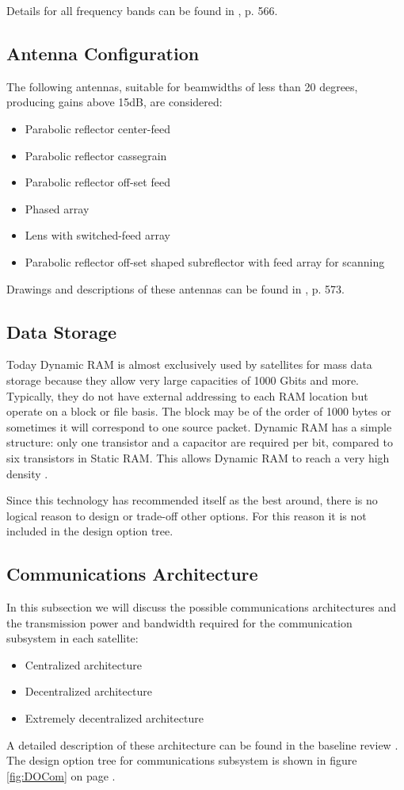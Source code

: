 Details for all frequency bands can be found in \cite{larson}, p. 566.

\subsection{Antenna Configuration}
The following antennas, suitable for beamwidths of less than 20 degrees, producing gains above 15dB, are considered:
\begin{itemize}
\item Parabolic reflector center-feed
\item Parabolic reflector cassegrain
\item Parabolic reflector off-set feed
\item Phased array
\item Lens with switched-feed array
\item Parabolic reflector off-set shaped subreflector with feed array for scanning
\end{itemize}

Drawings and descriptions of these antennas can be found in \cite{larson}, p. 573.

\subsection{Data Storage}
Today Dynamic RAM is almost exclusively used by satellites for mass data storage because they allow very large capacities of 1000 Gbits and more. Typically, they do not have external addressing to each RAM location but operate on a block or file basis. The block may be of the order of 1000 bytes or sometimes it will correspond to one source packet. Dynamic RAM has a simple structure: only one transistor and a capacitor are required per bit, compared to six transistors in Static RAM. This allows Dynamic RAM to reach a very high density \cite{sse}.

Since this technology has recommended itself as the best around, there is no logical reason to design or trade-off other options. For this reason it is not included in the design option tree.

\subsection{Communications Architecture}
In this subsection we will discuss the possible communications architectures and the transmission power and bandwidth required for the communication subsystem in each satellite:
\begin{itemize}
\item Centralized architecture
\item Decentralized architecture
\item Extremely decentralized architecture
\end{itemize}

A detailed description of these architecture can be found in the baseline review \cite{BR}.
The design option tree for communications subsystem is shown in figure \ref{fig:DOCom} on page \pageref{fig:DOCom}.
